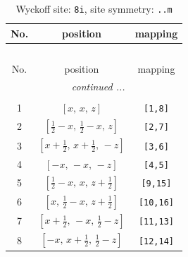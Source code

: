 \documentclass[fleqn,8pt]{jsarticle}
\begin{document}
\begin{longtable}{ccc}
\caption{Wyckoff site: {\tt 8i}, site symmetry: {\tt ..m}}
 \\
 \hline \hline
No. & position & mapping \\ \hline \endfirsthead

\multicolumn{2}{l}{\tablename\ \thetable{}} \\
 \hline \hline
No. & position & mapping \\ \hline \endhead

 \hline \hline
\multicolumn{2}{r}{\footnotesize\it continued ...} \\ \endfoot

 \hline \hline
\multicolumn{2}{r}{} \\ \endlastfoot

1 & $\left[ x,\, x,\, z \right]$ & {\tt [1,8]} \\ \hline
2 & $\left[ \frac{1}{2} - x,\, \frac{1}{2} - x,\, z \right]$ & {\tt [2,7]} \\ \hline
3 & $\left[ x + \frac{1}{2},\, x + \frac{1}{2},\, - z \right]$ & {\tt [3,6]} \\ \hline
4 & $\left[ - x,\, - x,\, - z \right]$ & {\tt [4,5]} \\ \hline
5 & $\left[ \frac{1}{2} - x,\, x,\, z + \frac{1}{2} \right]$ & {\tt [9,15]} \\ \hline
6 & $\left[ x,\, \frac{1}{2} - x,\, z + \frac{1}{2} \right]$ & {\tt [10,16]} \\ \hline
7 & $\left[ x + \frac{1}{2},\, - x,\, \frac{1}{2} - z \right]$ & {\tt [11,13]} \\ \hline
8 & $\left[ - x,\, x + \frac{1}{2},\, \frac{1}{2} - z \right]$ & {\tt [12,14]} \\
\end{longtable}
\renewcommand{\arraystretch}{1.2}
\end{document}
